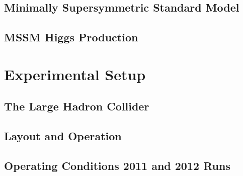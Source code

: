 \documentclass[oneside, letterpaper, 12pt, oldfontcommands]{memoir}
\begin{document}
\section{Minimally Supersymmetric Standard Model}
\section{MSSM Higgs Production}

\chapter{Experimental Setup}
\section{The Large Hadron Collider}
\section{Layout and Operation}
\section{Operating Conditions 2011 and 2012 Runs}


 
 
 
 
 
 
 
\end{document}
